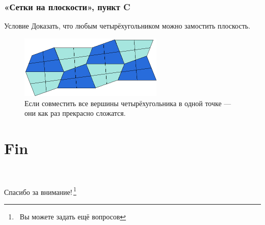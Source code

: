 \documentclass[aspectratio=1610,12pt]{beamer}
\def\fram#1#2{\begin{frame}\frametitle{\bf #1}#2\end{frame}}
\begin{document}
\fram{«Сетки на плоскости», пункт C}{
\vspace{0.3cm}
\begin{block}{Условие}
	Доказать, что любым четырёхугольником можно замостить плоскость.
\end{block}\pause
\vspace{-0.3cm}
\begin{figure}
	\includegraphics[height=3cm]{images/quadr-tessellate.png}
	\caption{Если совместить все вершины четырёхугольника в одной точке — они как раз прекрасно сложатся.}
\end{figure}
}





































\section[Конец]{Fin}
\renewcommand{\thefootnote}{/*\!/}
\begin{frame}
	\ \\
	\centerline{\huge Спасибо за внимание!\,\footnote{\ Вы можете задать ещё вопросов}}
\end{frame}
\end{document}
